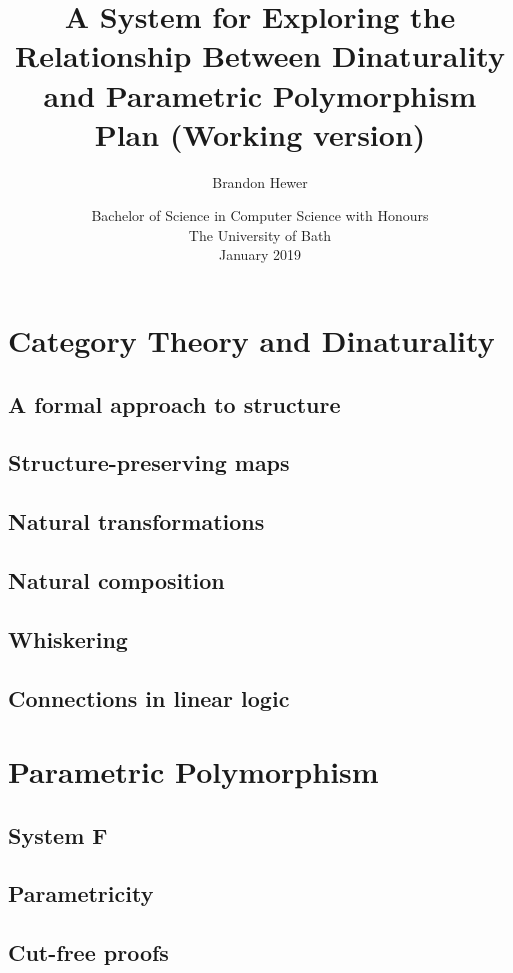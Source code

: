 \documentclass[11pt,openright,hidelinks,a4paper]{article}
\title{A System for Exploring the Relationship Between Dinaturality and Parametric Polymorphism\\\large{Plan (Working version)}}
\author{Brandon Hewer}
\date{Bachelor of Science in Computer Science with Honours\\The University of Bath\\January 2019}
\begin{document}
\setcounter{page}{0}

\maketitle

\newpage

\tableofcontents
\newpage

\setcounter{page}{1}

\section{Category Theory and Dinaturality}

\subsection{A formal approach to structure}
\subsection{Structure-preserving maps}
\subsection{Natural transformations}
\subsection{Natural composition}
\subsection{Whiskering}
\subsection{Connections in linear logic}

\section{Parametric Polymorphism}
\subsection{System F}
\subsection{Parametricity}
\subsection{Cut-free proofs}
\end{document}
